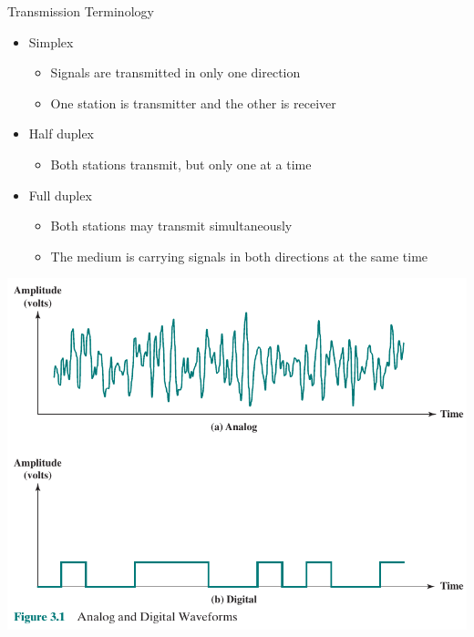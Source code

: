 \documentclass[pdflatex,compress]{beamer}
\begin{document}
\begin{frame}{Transmission Terminology}
	\begin{itemize}
		\item Simplex
		\begin{itemize}
			\item Signals are transmitted in only one direction
			\item One station is transmitter and the other is
			receiver
		\end{itemize}
		\item Half duplex 
		\begin{itemize}
			\item Both stations transmit, but only one at a time
		\end{itemize}
		\item Full duplex
		\begin{itemize}
			\item Both stations may transmit simultaneously
			\item The medium is carrying signals in both directions at the same time
		\end{itemize}
	\end{itemize}
\end{frame}

\begin{frame}
	\begin{center}
		\includegraphics[width=0.9\linewidth]{img/img01}
	\end{center}
\end{frame}
\end{document}
